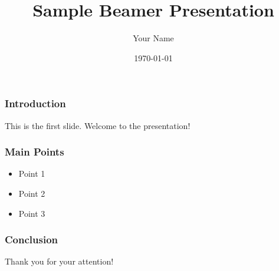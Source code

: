 \documentclass{beamer}%
\title{Sample Beamer Presentation}%
\author{Your Name}%
\date{\today}%
\begin{document}
%
\normalsize%
\frame{\titlepage}%
\begin{frame}%
\frametitle{Introduction}%
This is the first slide. Welcome to the presentation!%
\end{frame}%
\begin{frame}%
\frametitle{Main Points}%
\begin{itemize}%
\item Point 1%
\item Point 2%
\item Point 3%
\end{itemize}%
\end{frame}%
\begin{frame}%
\frametitle{Conclusion}%
Thank you for your attention!%
\end{frame}%
\end{document}
